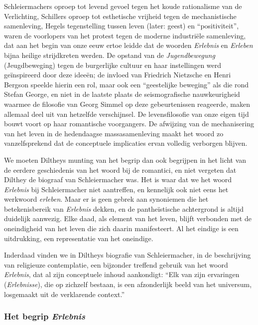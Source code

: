 Schleiermachers oproep tot levend gevoel tegen het koude rationalisme van de Verlichting, Schillers oproep tot esthetische vrijheid tegen de mechanistische samenleving, Hegels tegenstelling tussen leven (later: geest) en ``positiviteit'', waren de voorlopers van het protest tegen de moderne industriële samenleving, dat aan het begin van onze eeuw ertoe leidde dat de woorden \textit{Erlebnis} en \textit{Erleben} bijna heilige strijdkreten werden. De opstand van de \textit{Jugendbewegung} (Jeugdbeweging) tegen de burgerlijke cultuur en haar instellingen werd geïnspireerd door deze ideeën; de invloed van Friedrich Nietzsche en Henri Bergson speelde hierin een rol, maar ook een ``geestelijke beweging'' als die rond Stefan George, en niet in de laatste plaats de seismografische nauwkeurigheid waarmee de filosofie van Georg Simmel op deze gebeurtenissen reageerde, maken allemaal deel uit van hetzelfde verschijnsel. De levensfilosofie van onze eigen tijd bouwt voort op haar romantische voorgangers. De afwijzing van de mechanisering van het leven in de hedendaagse massasamenleving maakt het woord zo vanzelfsprekend dat de conceptuele implicaties ervan volledig verborgen blijven.

We moeten Diltheys munting van het begrip dan ook begrijpen in het licht van de eerdere geschiedenis van het woord bij de romantici, en niet vergeten dat Dilthey de biograaf van Schleiermacher was. Het is waar dat we het woord \textit{Erlebnis} bij Schleiermacher niet aantreffen, en kennelijk ook niet eens het werkwoord \textit{erleben}. Maar er is geen gebrek aan synoniemen die het betekenisbereik van \textit{Erlebnis} dekken, en de pantheïstische achtergrond is altijd duidelijk aanwezig. Elke daad, als element van het leven, blijft verbonden met de oneindigheid van het leven die zich daarin manifesteert. Al het eindige is een uitdrukking, een representatie van het oneindige.

Inderdaad vinden we in Diltheys biografie van Schleiermacher, in de beschrijving van religieuze contemplatie, een bijzonder treffend gebruik van het woord \textit{Erlebnis}, dat al zijn conceptuele inhoud aankondigt: ``Elk van zijn ervaringen (\textit{Erlebnisse}), die op zichzelf bestaan, is een afzonderlijk beeld van het universum, losgemaakt uit de verklarende context.''

\subsubsection{Het begrip \textit{Erlebnis}}

